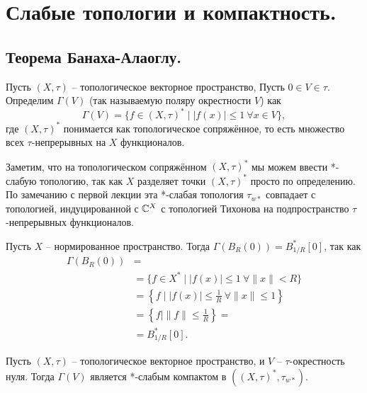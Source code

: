 \chapter{Слабые топологии и компактность.}
\section{Теорема Банаха-Алаоглу.}\label{seq:banach-alaogly}
\begin{definition}
    Пусть $(X, \tau)$ -- топологическое векторное пространство,
    Пусть $0 \in V \in \tau$.
    Определим $\Gamma(V)$ (так называемую поляру окрестности $V$) как
    \[
        \Gamma(V) = \{f \in (X, \tau)^* \mid |f(x)| \leq 1 \ \forall x \in V\},
    \]
    где $(X, \tau)^*$ понимается как топологическое сопряжённое, то есть множество всех $\tau$-непрерывных на $X$ функционалов.
\end{definition}
\begin{note}
    Заметим, что на топологическом сопряжённом $(X, \tau)^*$ мы можем ввести *-слабую топологию, так как $X$ разделяет точки $(X, \tau)^*$ просто по определению.
    По замечанию с первой лекции эта *-слабая топология $\tau_{w*}$ совпадает с топологией, индуцированной с $\mathbb{C}^X$ с топологией Тихонова на подпространство $\tau$-непрерывных функционалов.
\end{note}
\begin{example}
    Пусть $X$ -- нормированное пространство.
    Тогда $\Gamma(B_R(0)) = B_{1/R}^*[0]$, так как
    \[
        \begin{aligned}
            \Gamma(B_R(0)) &= \\
            &= \{f \in X^* \mid |f(x)| \leq 1 \ \forall \|x\| < R\} \\
            &= \left\{f \mid \left|f(x)\right| \leq \frac{1}{R} \  \forall \|x\| \leq 1\right\} \\
            &= \left\{f \mid \|f\| \leq \frac{1}{R}\right\} = \\
            &= B_{1/R}^*[0].
        \end{aligned}
    \]
\end{example}
\begin{theorem}
    Пусть $(X, \tau)$ -- топологическое векторное пространство, и $V$ -- $\tau$-окрестность нуля.
    Тогда $\Gamma(V)$ является *-слабым компактом в $((X, \tau)^*, \tau_{w*})$.
\end{theorem}
